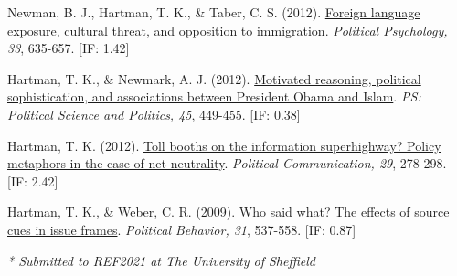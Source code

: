 \documentclass[12pt]{article}
\newcommand{\blankline}{\quad\pagebreak[3]}
\newcommand{\halfblankline}{\quad\vspace{-0.5\baselineskip}\pagebreak[3]}
\begin{document}
\begin{bibenum}
    \item Newman, B. J., {Hartman, T. K.}, \& Taber, C. S. (2012). 
          \href{https://10.1111/j.1467-9221.2012.00904.x}
          {Foreign language exposure, cultural threat, and opposition to immigration}. 
          \emph{Political Psychology, 33}, 635-657. [IF: 1.42]

    \item {Hartman, T. K.}, \& Newmark, A. J. (2012). 
          \href{https://10.1017/S1049096512000327}
          {Motivated reasoning, political sophistication, 
          and associations between President Obama and Islam}. 
          \emph{PS: Political Science and Politics, 45}, 449-455. [IF: 0.38]

    \item {Hartman, T. K.} (2012). 
          \href{https://10.1080/10584609.2012.694983}
          {Toll booths on the information superhighway? 
          Policy metaphors in the case of net neutrality}. 
          \emph{Political Communication, 29}, 278-298. [IF: 2.42]

    \item {Hartman, T. K.}, \& Weber, C. R. (2009). 
          \href{https://10.1007/s11109-009-9088-y}
          {Who said what? The effects of source cues in issue frames}. 
          \emph{Political Behavior, 31}, 537-558. [IF: 0.87]
          
\end{bibenum}

\blankline

\textit{* Submitted to REF2021 at The University of Sheffield}

\halfblankline
\end{document}
